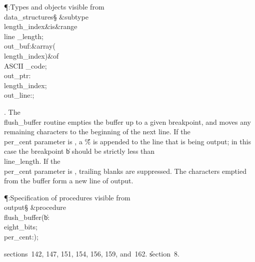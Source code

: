 \Y\P\?\4:Types and objects visible from \\{data\_structures}\X\mathrel{+}\S%
\?\6
\&{subtype}\8\\{length\_index}\8\&{is}\8\8\&{range}\?\to\?\\{line%
\_length};\6
\\{out\_buf}\?:\1\&{array}\8\1(\?\\{length\_index}\?\2)\2\8\&{of}\?\8\\{ASCII%
\_code};\6
\\{out\_ptr}\?:\?\\{length\_index};\6
\\{out\_line}\?:\?;\par
\fi

. The \\{flush\_buffer} routine empties the buffer up to a given
breakpoint,
and moves any remaining characters to the beginning of the next line.
If the \\{per\_cent} parameter is , a \H{\%} is appended to the line
that is being output; in this case the breakpoint \|b should be strictly
less than \\{line\_length}. If the \\{per\_cent} parameter is ,
trailing blanks are suppressed.
The characters emptied from the buffer form a new line of output.

\Y\P\?\4:Specification of procedures visible from \\{output}\X\S\?\6
\&{procedure}\8\1\\{flush\_buffer}\?(\?\|b\?:\?\\{eight\_bits};\?\,\1\?%
\\{per\_cent}\?:\?\?\2)\?\2;\par
\A sections~142, 147, 151, 154, 156, 159, and~162.
\U section~8\*.\fi


